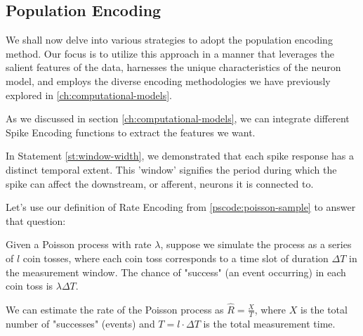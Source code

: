\subsection{Population Encoding}

We shall now delve into various strategies to adopt the population encoding method. Our focus is to utilize this approach in a manner that leverages the salient features of the data, harnesses the unique characteristics of the neuron model, and employs the diverse encoding methodologies we have previously explored in \ref{ch:computational-models}.

As we discussed in section \ref{ch:computational-models}, we can integrate different Spike Encoding functions to extract the features we want.

In Statement \ref{st:window-width}, we demonstrated that each spike response has a distinct temporal extent. This 'window' signifies the period during which the spike can affect the downstream, or afferent, neurons it is connected to.

Let's use our definition of Rate Encoding from \ref{pscode:poisson-sample} to answer that question:

Given a Poisson process with rate $\lambda$, suppose we simulate the process as a series of $l$ coin tosses, where each coin toss corresponds to a time slot of duration $\Delta T$ in the measurement window. The chance of "success" (an event occurring) in each coin toss is $\lambda \Delta T$.

We can estimate the rate of the Poisson process as $\hat{R} = \frac{X}{T}$, where $X$ is the total number of "successes" (events) and $T = l \cdot \Delta T$ is the total measurement time.

